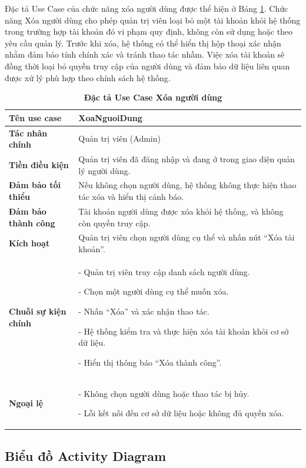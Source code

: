 \documentclass{article}
\begin{document}
	Đặc tả Use Case của chức năng xóa người dùng được thể hiện ở Bảng \ref{tab310}. Chức năng Xóa người dùng cho phép quản trị viên loại bỏ một tài khoản khỏi hệ thống trong trường hợp tài khoản đó vi phạm quy định, không còn sử dụng hoặc theo yêu cầu quản lý. Trước khi xóa, hệ thống có thể hiển thị hộp thoại xác nhận nhằm đảm bảo tính chính xác và tránh thao tác nhầm. Việc xóa tài khoản sẽ đồng thời loại bỏ quyền truy cập của người dùng và đảm bảo dữ liệu liên quan được xử lý phù hợp theo chính sách hệ thống.
	
	\begin{table}[H]
		\centering
		\caption [Đặc tả Use Case Xóa người dùng]{\bfseries \fontsize{12pt}{0pt}\selectfont Đặc tả Use Case Xóa người dùng}
		\label{tab310}
		\begin{tabular}{|p{4cm}|p{10.5cm}|}
			\hline
			\textbf{Tên use case} & XoaNguoiDung \\
			\hline
			\textbf{Tác nhân chính} & Quản trị viên (Admin) \\
			\hline
			\textbf{Tiền điều kiện} & Quản trị viên đã đăng nhập và đang ở trong giao diện quản lý người dùng. \\
			\hline
			\textbf{Đảm bảo tối thiểu} & Nếu không chọn người dùng, hệ thống không thực hiện thao tác xóa và hiển thị cảnh báo. \\
			\hline
			\textbf{Đảm bảo thành công} & Tài khoản người dùng được xóa khỏi hệ thống, và không còn quyền truy cập. \\
			\hline
			\textbf{Kích hoạt} & Quản trị viên chọn người dùng cụ thể và nhấn nút “Xóa tài khoản”. \\
			\hline
			\textbf{Chuỗi sự kiện chính} &
			- Quản trị viên truy cập danh sách người dùng.
			
			- Chọn một người dùng cụ thể muốn xóa.
			
			- Nhấn “Xóa” và xác nhận thao tác.
			
			- Hệ thống kiểm tra và thực hiện xóa tài khoản khỏi cơ sở dữ liệu.
			
			- Hiển thị thông báo “Xóa thành công”.
			\\
			\hline
			\textbf{Ngoại lệ} &
			- Không chọn người dùng hoặc thao tác bị hủy.
			
			- Lỗi kết nối đến cơ sở dữ liệu hoặc không đủ quyền xóa.
			\\
			\hline
		\end{tabular}
	\end{table}
	
	\subsection{Biểu đồ Activity Diagram}
\end{document}
